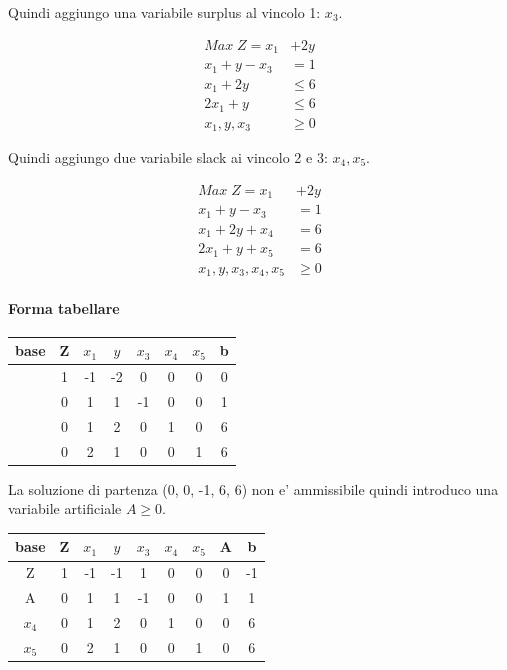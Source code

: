 \documentclass[a4paper,12pt,oneside]{article}
\begin{document}
    Quindi aggiungo una variabile surplus al vincolo 1: $x_3$.

    \begin{align*}
        Max \; Z = x_1 &+ 2 y \\
        x_1 + y - x_3 & = 1 \\
        x_1 + 2 y & \leq 6 \\
        2 x_1 + y & \leq 6 \\
        x_1, y, x_3 & \geq 0
    \end{align*}

    Quindi aggiungo due variabile slack ai vincolo 2 e 3: $x_4, x_5$.

    \begin{align*}
        Max \; Z = x_1 &+ 2 y \\
        x_1 + y - x_3 & = 1 \\
        x_1 + 2 y + x_4 & = 6 \\
        2 x_1 + y + x_5 & = 6 \\
        x_1, y, x_3, x_4, x_5 & \geq 0
    \end{align*}

    \paragraph{Forma tabellare}

    \begin{center}
        \begin{tabular}{||c c c c c c c c||}
            \hline
            base & Z & $x_1$ & $y$ & $x_3$ & $x_4$ & $x_5$ & b \\
            \hline
            \hline
            & 1 & -1 & -2 &  0 & 0 & 0 & 0 \\
            \hline
            & 0 &  1 &  1 & -1 & 0 & 0 & 1 \\
            \hline
            & 0 &  1 &  2 &  0 & 1 & 0 & 6 \\
            \hline
            & 0 &  2 &  1 &  0 & 0 & 1 & 6 \\
            \hline
        \end{tabular}
    \end{center}

    La soluzione di partenza (0, 0, -1, 6, 6) non e' ammissibile quindi introduco una variabile artificiale $A \geq 0$.

    \begin{center}
        \begin{tabular}{||c c c c c c c c c||}
            \hline
            base & Z & $x_1$ & $y$ & $x_3$ & $x_4$ & $x_5$ & A & b \\
            \hline
            \hline
            Z     & 1 & -1 & -1 &  1 & 0 & 0 & 0 & -1 \\
            \hline
            A     & 0 &  1 &  1 & -1 & 0 & 0 & 1 &  1 \\
            \hline
            $x_4$ & 0 &  1 &  2 &  0 & 1 & 0 & 0 &  6 \\
            \hline
            $x_5$ & 0 &  2 &  1 &  0 & 0 & 1 & 0 &  6 \\
            \hline
        \end{tabular}
    \end{center}
\end{document}
